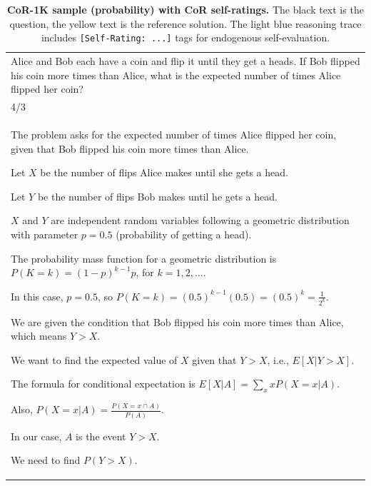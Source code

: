 \documentclass{article}
\theoremstyle{plain}
\theoremstyle{definition}
\theoremstyle{remark}
\newcommand{\data}{\textbf{CoR-1K}}
\newcommand{\defaultlightblue}[1]{{\leavevmode\color{bluec}#1}}
\newcommand{\defaultyellow}[1]{{\leavevmode\color{olmoeDarkYellow}#1}}
\begin{document}
\begin{longtable}{@{}p{\columnwidth}@{}}
\caption{{\textbf{\data{} sample (probability) with CoR self-ratings.} The black text is the question, the \textcolor{olmoeDarkYellow}{yellow} text is the reference solution. The \textcolor{defaultlightblue}{light blue} reasoning trace includes \texttt{[Self-Rating: ...]} tags for endogenous self-evaluation.}} \\
\toprule

Alice and Bob each have a coin and flip it until they get a heads. If Bob flipped his coin more times than Alice, what is the expected number of times Alice flipped her coin?

\\

\defaultyellow{4/3}

\\

\defaultlightblue{
The problem asks for the expected number of times Alice flipped her coin, given that Bob flipped his coin more times than Alice.



Let $X$ be the number of flips Alice makes until she gets a head.

Let $Y$ be the number of flips Bob makes until he gets a head.



$X$ and $Y$ are independent random variables following a geometric distribution with parameter $p = 0.5$ (probability of getting a head).

The probability mass function for a geometric distribution is $P(K=k) = (1-p)^{k-1} p$, for $k=1, 2, \dots$.

In this case, $p = 0.5$, so $P(K=k) = (0.5)^{k-1} (0.5) = (0.5)^k = \frac{1}{2^k}$.



We are given the condition that Bob flipped his coin more times than Alice, which means $Y > X$.

We want to find the expected value of $X$ given that $Y > X$, i.e., $E[X | Y > X]$.



The formula for conditional expectation is $E[X | A] = \sum_x x P(X=x | A)$.

Also, $P(X=x | A) = \frac{P(X=x \cap A)}{P(A)}$.



In our case, $A$ is the event $Y > X$.

We need to find $P(Y > X)$.

}
\end{longtable}
\end{document}
